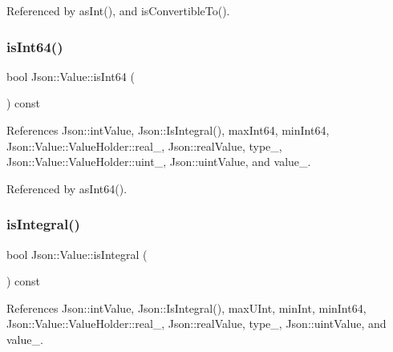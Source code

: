 Referenced by as\+Int(), and is\+Convertible\+To().

\mbox{\label{classJson_1_1Value_a4a81fb3c3acdbb68b2e2f30836a4f53e_a4a81fb3c3acdbb68b2e2f30836a4f53e}} 
\subsubsection{\texorpdfstring{is\+Int64()}{isInt64()}}
{\footnotesize\ttfamily bool Json\+::\+Value\+::is\+Int64 (\begin{DoxyParamCaption}{ }\end{DoxyParamCaption}) const}



References Json\+::int\+Value, Json\+::\+Is\+Integral(), max\+Int64, min\+Int64, Json\+::\+Value\+::\+Value\+Holder\+::real\+\_\+, Json\+::real\+Value, type\+\_\+, Json\+::\+Value\+::\+Value\+Holder\+::uint\+\_\+, Json\+::uint\+Value, and value\+\_\+.



Referenced by as\+Int64().

\mbox{\label{classJson_1_1Value_ab6798954f6e80281cf22708ef45198a7_ab6798954f6e80281cf22708ef45198a7}} 
\subsubsection{\texorpdfstring{is\+Integral()}{isIntegral()}}
{\footnotesize\ttfamily bool Json\+::\+Value\+::is\+Integral (\begin{DoxyParamCaption}{ }\end{DoxyParamCaption}) const}



References Json\+::int\+Value, Json\+::\+Is\+Integral(), max\+U\+Int, min\+Int, min\+Int64, Json\+::\+Value\+::\+Value\+Holder\+::real\+\_\+, Json\+::real\+Value, type\+\_\+, Json\+::uint\+Value, and value\+\_\+.

\mbox{\label{classJson_1_1Value_ad6d4df2227321bab05e86667609a7fad_ad6d4df2227321bab05e86667609a7fad}} 

